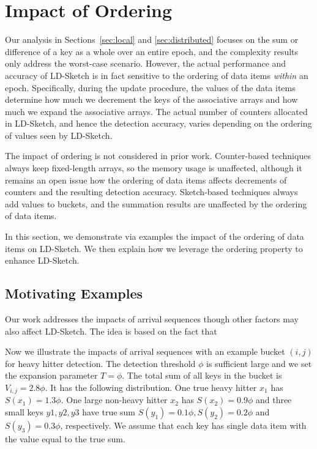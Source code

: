 \section{Impact of Ordering}
\label{sec:new}

Our analysis in Sections~\ref{sec:local} and \ref{sec:distributed} focuses on
the sum or difference of a key as a whole over an entire epoch, and the
complexity results only address the worst-case scenario.  However, the actual
performance and accuracy of LD-Sketch is in fact sensitive to the ordering of
data items {\em within} an epoch.  Specifically, during the update procedure,
the values of the data items determine how much we decrement the keys of the
associative arrays and how much we expand the associative arrays.  The actual
number of counters allocated in LD-Sketch, and hence the detection accuracy,
varies depending on the ordering of values seen by LD-Sketch.  

The impact of ordering is not considered in prior work.
Counter-based techniques always keep fixed-length arrays, so the memory usage
is unaffected, although it remains an open issue how the ordering of data
items affects decrements of counters and the resulting detection accuracy.
Sketch-based techniques always add values to buckets, and the summation
results are unaffected by the ordering of data items. 

In this section, we demonstrate via examples the impact of the ordering of
data items on LD-Sketch.  We then explain how we leverage the ordering
property to enhance LD-Sketch. 

\subsection{Motivating Examples}
\label{sec:new_example}




Our work addresses the impacts of arrival sequences
though other factors may also affect LD-Sketch.
The idea is based on the fact that 

Now we illustrate the impacts of arrival sequences with an example bucket $(i,j)$ for heavy hitter detection.
The detection threshold $\phi$ is sufficient large and we set the expansion parameter $T=\phi$.
The total sum of all keys in the bucket is $V_{i, j} = 2.8\phi$.
It has the following distribution.
One true heavy hitter $x_1$ has $S(x_1) = 1.3\phi$.
One large non-heavy hitter $x_2$ has $S(x_2)=0.9\phi$ and
three small keys $y1, y2, y3$ have true sum $S(y_1)=0.1\phi, S(y_2)=0.2\phi$ and $S(y_3)=0.3\phi$, respectively. 
We assume that each key has single data item with the value equal to the true sum.

